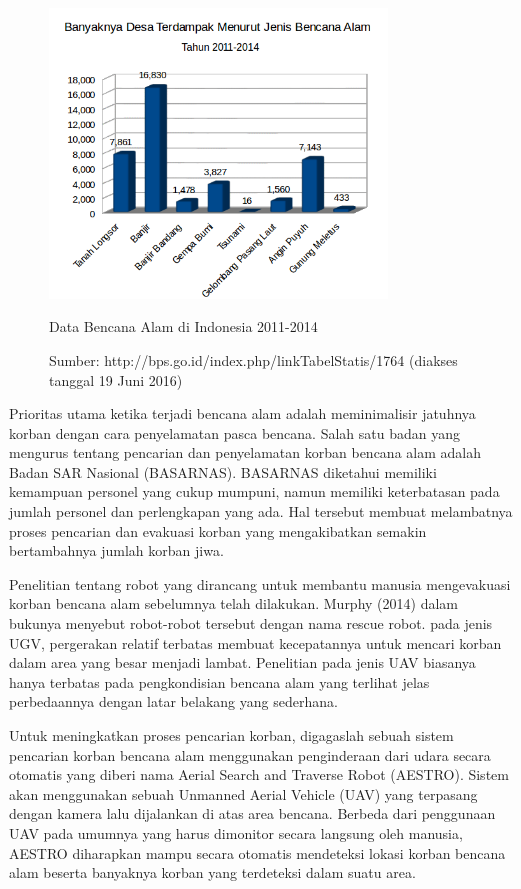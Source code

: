 \begin{figure}[ht]
\centering
 \includegraphics[width=0.8\textwidth]{chart_desa_terdampak}
 \caption{Data Bencana Alam di Indonesia 2011-2014}
 \caption*{Sumber: http://bps.go.id/index.php/linkTabelStatis/1764 (diakses tanggal 19 Juni 2016)}
 \label{fig:chart_desa_terdampak}   
\end{figure}

Prioritas utama ketika terjadi bencana alam adalah meminimalisir jatuhnya korban dengan cara penyelamatan pasca bencana. Salah satu badan yang mengurus tentang pencarian dan penyelamatan korban bencana alam adalah Badan SAR Nasional (BASARNAS). BASARNAS diketahui memiliki kemampuan personel yang cukup mumpuni, namun memiliki keterbatasan pada jumlah personel dan perlengkapan yang ada. Hal tersebut membuat melambatnya proses pencarian dan evakuasi korban yang mengakibatkan semakin bertambahnya jumlah korban jiwa.

Penelitian tentang robot yang dirancang untuk membantu manusia mengevakuasi korban bencana alam sebelumnya telah dilakukan. Murphy (2014) dalam bukunya menyebut robot-robot tersebut dengan nama rescue robot. pada jenis UGV, pergerakan relatif terbatas membuat kecepatannya untuk mencari korban dalam area yang besar menjadi lambat. Penelitian pada jenis UAV biasanya hanya terbatas pada pengkondisian bencana alam yang terlihat jelas perbedaannya dengan latar belakang yang sederhana.

Untuk meningkatkan proses pencarian korban, digagaslah sebuah sistem pencarian korban bencana alam menggunakan penginderaan dari udara secara otomatis yang diberi nama Aerial Search and Traverse Robot (AESTRO). Sistem akan menggunakan sebuah Unmanned Aerial Vehicle (UAV) yang terpasang dengan kamera lalu dijalankan di atas area bencana. Berbeda dari penggunaan UAV pada umumnya yang harus dimonitor secara langsung oleh manusia, AESTRO diharapkan mampu secara otomatis mendeteksi lokasi korban bencana alam beserta banyaknya korban yang terdeteksi dalam suatu area.

